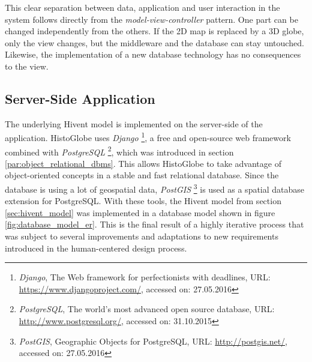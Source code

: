This clear separation between data, application and user interaction in the system follows directly from the \emph{model-view-controller} pattern. One part can be changed independently from the others. If the 2D map is replaced by a 3D globe, only the view changes, but the middleware and the database can stay untouched. Likewise, the implementation of a new database technology has no consequences to the view.


\subsection{Server-Side Application} %
\label{sub:server_side_application}

The underlying Hivent model is implemented on the server-side of the application. HistoGlobe uses \emph{Django}
\footnote{
  \emph{Django},
  The Web framework for perfectionists with deadlines,
  URL: \url{https://www.djangoproject.com/},
  accessed on: 27.05.2016
},
a free and open-source web framework combined with \emph{PostgreSQL}
\footnote{
  \emph{PostgreSQL},
  The world's most advanced open source database,
  URL: \url{http://www.postgresql.org/},
  accessed on: 31.10.2015
},
which was introduced in section \ref{par:object_relational_dbms}. This allows HistoGlobe to take advantage of object-oriented concepts in a stable and fast relational database. Since the database is using a lot of geospatial data, \emph{PostGIS}
\footnote{
  \emph{PostGIS},
  Geographic Objects for PostgreSQL,
  URL: \url{http://postgis.net/},
  accessed on: 27.05.2016
}
is used as a spatial database extension for PostgreSQL. With these tools, the Hivent model from section \ref{sec:hivent_model}  was implemented in a database model shown in figure \ref{fig:database_model_er}. This is the final result of a highly iterative process that was subject to several improvements and adaptations to new requirements introduced in the human-centered design process.

